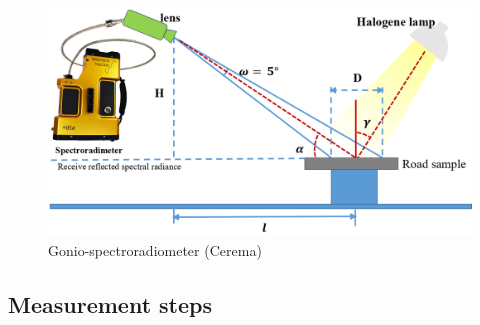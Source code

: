 \begin{figure}[!tb]
    \centering
    \includegraphics[width=0.9\linewidth]{./figures/spectral-brdf-measurements/gonio-simple.png}
    \caption{Gonio-spectroradiometer (Cerema)}
    \label{fig:gonio-simple}
\end{figure}

\subsection{Measurement steps}

